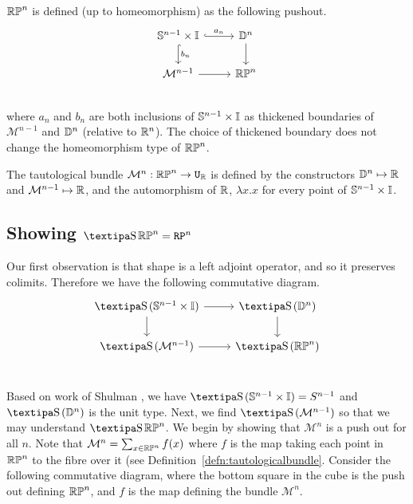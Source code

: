 \documentclass{amsart}
\begin{document}
\begin{definition} $\mathbb{RP}^n$ is defined (up to homeomorphism) as the following pushout.\\
\[\begin{tikzcd}
\set{S}^{n-1} \times \set{I} \arrow[r, hook, "a_n"] \arrow[d, hook, "b_n" ] &\set{D}^{n} \arrow[d]\\
\mathcal{M}^{n-1} \arrow[r] &\set{RP}^n\\
\end{tikzcd}
\] where $a_n$ and $b_n$ are both inclusions of $\mathbb{S}^{n-1} \times \mathbb{I} $ as thickened boundaries of $\mathcal{M}^{n-1}$ and $\mathbb{D}^{n}$ (relative to $\mathbb{R}^n$). The choice of thickened boundary does not change the homeomorphism type of $\mathbb{RP}^n$.
\end{definition}

\begin{definition}
\label{defn:tautologicalbundle}
The tautological bundle $\mathcal{M}^n: \mathbb{RP}^n \rightarrow \mathtt{U}_{\mathbb{R}}$ is defined by the constructors $\mathbb{D}^n \mapsto \mathbb{R}$ and $\mathcal{M}^{n-1} \mapsto \mathbb{R}$, and the automorphism of $\mathbb{R}$, $\lambda x.x$ for every point of $\mathbb{S}^{n-1} \times \mathbb{I}$.
\end{definition}



\subsection{Showing $ \shape \set{RP}^n = \RP^n $}
Our first observation is that shape is a left adjoint operator, and so it preserves colimits. Therefore we have the following commutative diagram.
\[\begin{tikzcd}
\shape(\set{S}^{n-1} \times \set{I}) \arrow[r] \arrow[d] &\shape (\set{D}^{n}) \arrow[d]\\
\shape (\mathcal{M}^{n-1}) \arrow[r] &\shape (\set{RP}^n)\\
\end{tikzcd}
\] 

Based on work of Shulman \cite{shul:bfp}, we have $\shape(\set{S}^{n-1} \times \set{I}) =S^{n-1}$ and $\shape (\set{D}^{n})$ is the unit type. Next, we find $\shape (\mathcal{M}^{n-1})$ so that we may understand $ \shape \set{RP}^n$.  We begin by showing that $\mathcal{M}^{n}$ is a push out for all $n$. Note that $\mathcal{M}^n= \sum _{x \in \mathbb{RP}^n} f(x)$ where $f$ is the map taking each point in $\mathbb{RP}^n$ to the fibre over it (see Definition~\ref{defn:tautologicalbundle}. Consider the following commutative diagram, where the bottom square in the cube is the push out defining $\mathbb{RP}^n$, and $f$ is the map defining the bundle  $ \mathcal{M}^{n}$.
\end{document}
